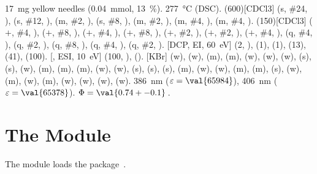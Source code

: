 \documentclass{chemmacros-manual}
\begin{document}
\begin{experimental}[
    format=\color{red}\itshape,
    list=true,
    delta=\textcolor{green}{\ch{M+ + H2O}},
    pos-number=side,
    coupling-unit=\mega\gram\per\square\second,
    list-setup=,use-equal]
   \SI{17}{\milli\gram} yellow needles (\SI{0.04}{\milli\mole},
  \SI{13}{\percent}).
   \SI{277}{\celsius} (DSC).
  \NMR(600)[CDCl3]  (s, \#{24}, ),  (s, \#{12},
  ),  (m, \#{2}, ),  (s, \#{8},
  ),  (m, \#{2}, ),  (m, \#{4},
  ),  (m, \#{4}, ).
  (150)[CDCl3]  ($+$, \#{4}, ),  ($+$,
  \#{8}, ),  ($+$, \#{4}, ),  ($+$, \#{8},
  ),  ($+$, \#{2}, ),  ($+$, \#{2},
  ),  ($+$, \#{4}, ),  (q, \#{4},
  ),  (q, \#{2}, ),  (q, \#{8}, ),
   (q, \#{4}, ),  (q, \#{2}, ).
  [DCP, EI, \SI{60}{\electronvolt}]  (2, ), 
  (1),  (1),  (13),  (41),  (100).
  [, ESI, \SI{10}{\electronvolt}]  (100,
  ),  ().
  [KBr]  (w),  (w),  (m), 
  (m),  (w),  (w),  (w),  (s),
   (s),  (w),  (m),  (m), 
  (m),  (w),  (w),  (s),  (s),
   (s),  (m),  (w),  (w), 
  (m),  (m),  (s),  (w),  (m), 
  (w),  (m),  (w),  (w),  (w), 
  (w).
   \SI{386}{\nano\metre} ($\varepsilon = \val{65984}$),
  \SI{406}{\nano\metre} ($\varepsilon = \val{65378}$).
   $\Phi = \val{0.74+-0.1}$\,.
\end{experimental}

\section{The  Module}\label{sec:thermodynamics-module}

The  module loads the 
package~\cite{pkg:siunitx}.
\end{document}
